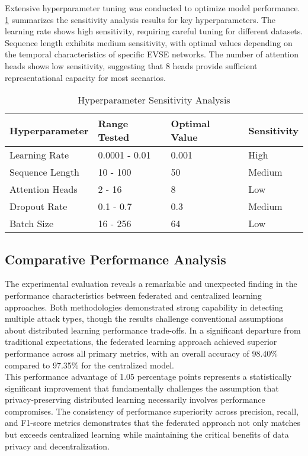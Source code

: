 Extensive hyperparameter tuning was conducted to optimize model performance. \ref{tab:hyperparameter_sensitivity} summarizes the sensitivity analysis results for key hyperparameters. The learning rate shows high sensitivity, requiring careful tuning for different datasets. Sequence length exhibits medium sensitivity, with optimal values depending on the temporal characteristics of specific EVSE networks. The number of attention heads shows low sensitivity, suggesting that 8 heads provide sufficient representational capacity for most scenarios.

\begin{table}[H]
	\centering
	\renewcommand{\arraystretch}{1.15}
	\setlength{\tabcolsep}{8pt}
	\caption{Hyperparameter Sensitivity Analysis}
	\label{tab:hyperparameter_sensitivity}
	\begin{tabular}{@{}llll@{}}
		\toprule
		\textbf{Hyperparameter} & \textbf{Range Tested} & \textbf{Optimal Value} & \textbf{Sensitivity} \\
		\midrule
		Learning Rate & 0.0001 - 0.01 & 0.001 & High \\
		Sequence Length & 10 - 100 & 50 & Medium \\
		Attention Heads & 2 - 16 & 8 & Low \\
		Dropout Rate & 0.1 - 0.7 & 0.3 & Medium \\
		Batch Size & 16 - 256 & 64 & Low \\
		\bottomrule
	\end{tabular}
\end{table}

\subsection{Comparative Performance Analysis}
The experimental evaluation reveals a remarkable and unexpected finding in the performance characteristics between federated and centralized learning approaches. Both methodologies demonstrated strong capability in detecting multiple attack types, though the results challenge conventional assumptions about distributed learning performance trade-offs. In a significant departure from traditional expectations, the federated learning approach achieved superior performance across all primary metrics, with an overall accuracy of 98.40\% compared to 97.35\% for the centralized model. \\ 

This performance advantage of 1.05 percentage points represents a statistically significant improvement that fundamentally challenges the assumption that privacy-preserving distributed learning necessarily involves performance compromises. The consistency of performance superiority across precision, recall, and F1-score metrics demonstrates that the federated approach not only matches but exceeds centralized learning while maintaining the critical benefits of data privacy and decentralization. 

